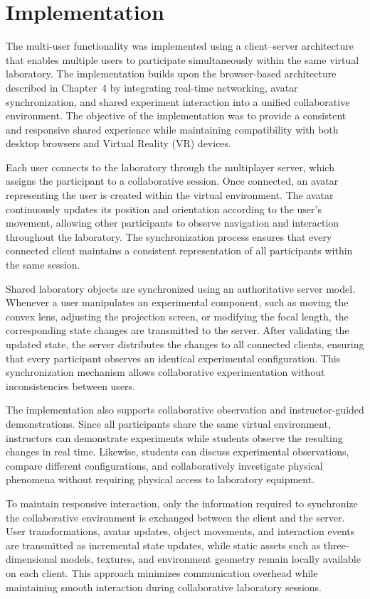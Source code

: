 \section{Implementation}

The multi-user functionality was implemented using a client--server architecture that enables multiple users to participate simultaneously within the same virtual laboratory. The implementation builds upon the browser-based architecture described in Chapter~4 by integrating real-time networking, avatar synchronization, and shared experiment interaction into a unified collaborative environment. The objective of the implementation was to provide a consistent and responsive shared experience while maintaining compatibility with both desktop browsers and Virtual Reality (VR) devices.

Each user connects to the laboratory through the multiplayer server, which assigns the participant to a collaborative session. Once connected, an avatar representing the user is created within the virtual environment. The avatar continuously updates its position and orientation according to the user's movement, allowing other participants to observe navigation and interaction throughout the laboratory. The synchronization process ensures that every connected client maintains a consistent representation of all participants within the same session.

Shared laboratory objects are synchronized using an authoritative server model. Whenever a user manipulates an experimental component, such as moving the convex lens, adjusting the projection screen, or modifying the focal length, the corresponding state changes are transmitted to the server. After validating the updated state, the server distributes the changes to all connected clients, ensuring that every participant observes an identical experimental configuration. This synchronization mechanism allows collaborative experimentation without inconsistencies between users.

The implementation also supports collaborative observation and instructor-guided demonstrations. Since all participants share the same virtual environment, instructors can demonstrate experiments while students observe the resulting changes in real time. Likewise, students can discuss experimental observations, compare different configurations, and collaboratively investigate physical phenomena without requiring physical access to laboratory equipment.

To maintain responsive interaction, only the information required to synchronize the collaborative environment is exchanged between the client and the server. User transformations, avatar updates, object movements, and interaction events are transmitted as incremental state updates, while static assets such as three-dimensional models, textures, and environment geometry remain locally available on each client. This approach minimizes communication overhead while maintaining smooth interaction during collaborative laboratory sessions.

